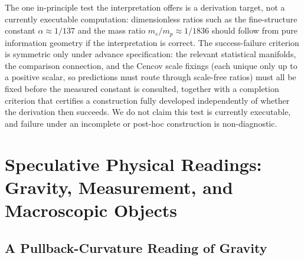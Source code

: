 \documentclass[11pt]{article}
\begin{document}
The one in-principle test the interpretation offers is a derivation target, not a currently executable computation: dimensionless ratios such as the fine-structure constant $\alpha \approx 1/137$ and the mass ratio $m_e/m_p \approx 1/1836$ should follow from pure information geometry if the interpretation is correct. The success-failure criterion is symmetric only under advance specification: the relevant statistical manifolds, the comparison connection, and the Cencov scale fixings (each unique only up to a positive scalar, so predictions must route through scale-free ratios) must all be fixed before the measured constant is consulted, together with a completion criterion that certifies a construction fully developed independently of whether the derivation then succeeds. We do not claim this test is currently executable, and failure under an incomplete or post-hoc construction is non-diagnostic.

\section{Speculative Physical Readings: Gravity, Measurement, and Macroscopic Objects}\label{sec:speculative_physics}

\subsection{A Pullback-Curvature Reading of Gravity}
\label{sec:gravity_pullback}
\end{document}
